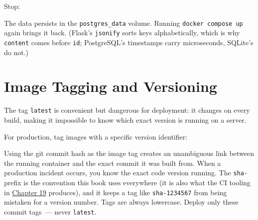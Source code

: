 \noindent{}Stop:

\begin{codebox}[short]

\begin{Shaded}
\begin{Highlighting}[]
\end{Highlighting}
\end{Shaded}

\end{codebox}

\noindent{}The data persists in the \texttt{postgres\_data} volume. Running \texttt{docker\ compose\ up} again brings it back. (Flask's \texttt{jsonify} sorts keys alphabetically, which is why \texttt{content} comes before \texttt{id}; PostgreSQL's timestamps carry microseconds, SQLite's do not.)

\setcounter{section}{6}
\section{Image Tagging and Versioning}\label{18-containerization:187-image-tagging-and-versioning}

The tag \texttt{latest} is convenient but dangerous for deployment: it changes on every build, making it impossible to know which exact version is running on a server.

For production, tag images with a specific version identifier:

\begin{codebox}[short]

\begin{Shaded}
\begin{Highlighting}[]
\OperatorTok{=}\VariableTok{$(}\VariableTok{)}
 

\end{Highlighting}
\end{Shaded}

\end{codebox}

\noindent{}Using the git commit hash as the image tag creates an unambiguous link between the running container and the exact commit it was built from. When a production incident occurs, you know the exact code version running. The \texttt{sha-} prefix is the convention this book uses everywhere (it is also what the CI tooling in \hyperref[ch:19-artifact-storage]{Chapter 19} produces), and it keeps a tag like \texttt{sha-1234567} from being mistaken for a version number. Tags are always lowercase. Deploy only these commit tags~--- never \texttt{latest}.

